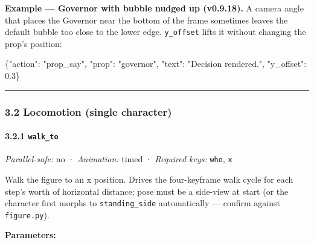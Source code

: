 \documentclass[
  11pt,
]{book}
\newenvironment{Shaded}{}{}
\newcommand{\DataTypeTok}[1]{\textcolor[rgb]{0.56,0.13,0.00}{#1}}
\newcommand{\FloatTok}[1]{\textcolor[rgb]{0.25,0.63,0.44}{#1}}
\newcommand{\FunctionTok}[1]{\textcolor[rgb]{0.02,0.16,0.49}{#1}}
\newcommand{\StringTok}[1]{\textcolor[rgb]{0.25,0.44,0.63}{#1}}
\begin{document}
\textbf{Example --- Governor with bubble nudged up (v0.9.18).} A
camera angle that places the Governor near the bottom of the frame
sometimes leaves the default bubble too close to the lower edge.
\texttt{y\_offset} lifts it without changing the prop's position:

\begin{Shaded}
\begin{Highlighting}[]
\FunctionTok{\{}\DataTypeTok{"action"}\FunctionTok{:} \StringTok{"prop\_say"}\FunctionTok{,} \DataTypeTok{"prop"}\FunctionTok{:} \StringTok{"governor"}\FunctionTok{,}
 \DataTypeTok{"text"}\FunctionTok{:} \StringTok{"Decision rendered."}\FunctionTok{,}
 \DataTypeTok{"y\_offset"}\FunctionTok{:} \FloatTok{0.3}\FunctionTok{\}}
\end{Highlighting}
\end{Shaded}

\begin{center}\rule{0.5\linewidth}{0.5pt}\end{center}

\subsubsection{3.2 Locomotion (single
character)}\label{locomotion-single-character}

\paragraph{\texorpdfstring{3.2.1
\texttt{walk\_to}}{3.2.1 walk\_to}}\label{walk_to}

\emph{Parallel-safe:} no · \emph{Animation:} timed · \emph{Required
keys:} \texttt{who}, \texttt{x}

Walk the figure to an x position. Drives the four-keyframe walk cycle
for each step's worth of horizontal distance; pose must be a side-view
at start (or the character first morphs to \texttt{standing\_side}
automatically --- confirm against \texttt{figure.py}).

\textbf{Parameters:}
\end{document}
